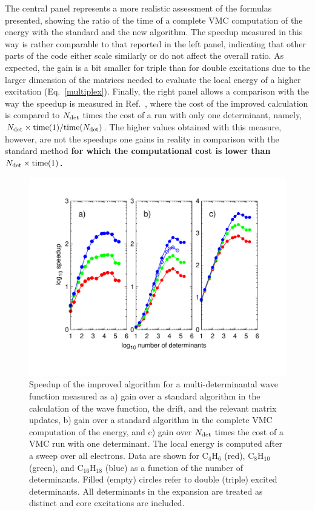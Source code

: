 \documentclass[aip,jcp,reprint,floatfix,onecolumn]{revtex4-1}
\begin{document}
The central panel represents a more realistic assessment of the formulas presented, showing the ratio of the time of a
complete VMC computation of the energy with the standard and the new algorithm. The speedup measured in this way is rather comparable to
that reported in the left panel, indicating that other parts of the code either scale similarly or do not affect the overall ratio.
As expected, the gain is a bit smaller for triple than for double excitations due to the larger dimension of the matrices needed to evaluate
the local energy of a higher excitation (Eq.~\ref{multiplex}).
Finally, the right panel allows a comparison with the way the speedup is measured in Ref.~, where the cost of the
improved calculation is compared to $N_{\rm det}$ times the cost of a run with only one determinant, namely,
${N_{\rm det}\times{\rm time}(1)}/{{\rm time}(N_{\rm det})}$.
The higher values obtained with this measure, however, are not the speedups one gains in reality in comparison with the standard method {\bf for which the computational cost  is lower than ${N_{\rm det}\times{\rm time}(1)}$.}

\begin{figure}
\includegraphics[width=\columnwidth]{mdet.pdf}
\caption{
Speedup of the improved algorithm for a multi-determinantal wave function measured as a)
gain over a standard algorithm in the calculation of the wave function, the drift, and the relevant matrix updates,
b) gain over a standard algorithm in the complete VMC computation of the energy, and c) gain over $N_{\rm det}$ times
the cost of a VMC run with one determinant.  The local energy is computed after a sweep over all electrons.
Data are shown for C$_4$H$_6$ (red), C$_8$H$_{10}$ (green),  and C$_{16}$H$_{18}$ (blue) as a function of the number of determinants.
Filled (empty) circles refer to double (triple) excited determinants. All determinants in the expansion are treated as distinct and core
excitations are included.
}
\label{mdet_a}
\end{figure}
\end{document}
